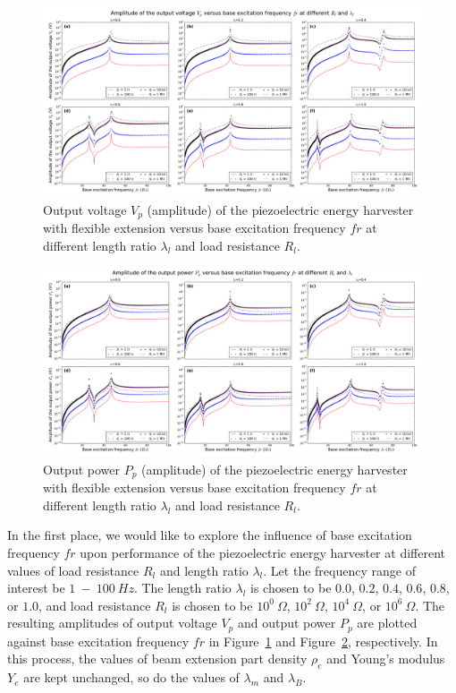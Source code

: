 \documentclass{elsarticle}
\begin{document}
\begin{figure}[!htbp]
    \centering
    \includegraphics[width=\textwidth]{./fig_output_voltage_vs_fr_Rl_laml_all}
    \caption{Output voltage $V_p$ (amplitude) of the piezoelectric energy harvester with flexible extension versus base excitation frequency $fr$ at different length ratio $\lambda_l$ and load resistance $R_l$. }
    \label{fig:fig_output_voltage_vs_fr_Rl_laml_all}
\end{figure}



\begin{figure}[!htbp]
    \centering
    \includegraphics[width=\textwidth]{./fig_output_power_vs_fr_Rl_laml_all}
    \caption{Output power $P_p$ (amplitude) of the piezoelectric energy harvester with flexible extension versus base excitation frequency $fr$ at different length ratio $\lambda_l$ and load resistance $R_l$. }
    \label{fig:fig_output_power_vs_fr_Rl_laml_all}
\end{figure}


In the first place, we would like to explore the influence of base excitation frequency $fr$ upon performance of the piezoelectric energy harvester at different values of load resistance $R_l$ and length ratio $\lambda_l$. Let the frequency range of interest be $1\ -\ 100\ Hz$. The length ratio $\lambda_l$ is chosen to be $0.0$, $0.2$, $0.4$, $0.6$, $0.8$, or $1.0$, and load resistance $R_l$ is chosen to be $10^0\ \Omega$, $10^2\ \Omega$, $10^4\ \Omega$, or $10^6\ \Omega$. The resulting amplitudes of output voltage $V_p$ and output power $P_p$ are plotted against base excitation frequency $fr$ in Figure~\ref{fig:fig_output_voltage_vs_fr_Rl_laml_all} and Figure~\ref{fig:fig_output_power_vs_fr_Rl_laml_all}, respectively. In this process, the values of beam extension part density $\rho_e$ and Young's modulus $Y_e$ are kept unchanged, so do the values of $\lambda_m$ and $\lambda_B$.
\end{document}
